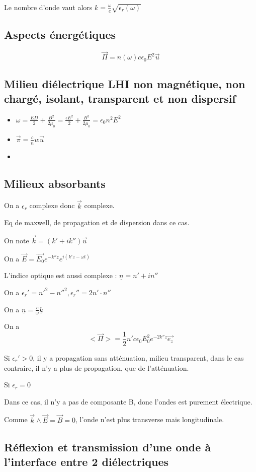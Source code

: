 \documentclass[french]{yLectureNote}
\renewcommand{\vec}{\overrightarrow}
\begin{document}
Le nombre d'onde vaut alors $ k = \frac{\omega}{c}\sqrt{\epsilon_r(\omega)}$
\subsection{Aspects énergétiques}
$$\vec{\Pi} = n(\omega)c\epsilon_0E^2\vec{u}$$
\subsection{Milieu diélectrique LHI non magnétique, non chargé, isolant, transparent et non dispersif}
\begin{itemize}
    \item $\omega = \frac{ED}{2}+\frac{B^2}{2\mu_0} = \frac{\epsilon E^2}{2}+\frac{B^2}{2\mu_0} = \epsilon_0n^2E^2$
    \item $\vec{\pi} = \frac{c}{n}w\vec{u}$
    \item %
\end{itemize}
\subsection{Milieux absorbants}
On a $\epsilon_r$ complexe donc $\vec{k}$ complexe.

Eq de maxwell, de propagation et de dispersion dans ce cas.

On note $\vec{k} = (k'+ik'')\vec{u}$

On a $\vec{E} = \vec{E_0}e^{-k''z}e^{i(k'z-\omega t)}$


L'indice optique est aussi complexe : $\underline{n} = n'+in''$

On a $\epsilon_r' = n'^2-n''^2, \epsilon_r''=2n'\cdot n''$

On a $\underline{n} = \frac{c}{\omega}\underline{k}$

On a $$<\vec{\Pi}> = \frac12 n' c\epsilon_0E_0^2e^{-2k''z}\vec{e_z}$$

Si $\epsilon_r'>0$, il y a propagation sans atténuation, milieu transparent, dans le cas contraire, il n'y a plus de propagation, que de l'atténuation.

Si $\epsilon_r = 0$

Dans ce cas, il n'y a pas de composante B, donc l'ondes est purement électrique.

Comme $\vec{k}\wedge \vec{E} = \vec{B} = 0$, l'onde n'est plus transverse mais longitudinale.

\subsection{Réflexion et transmission d'une onde à l'interface entre 2 diélectriques}
\end{document}
